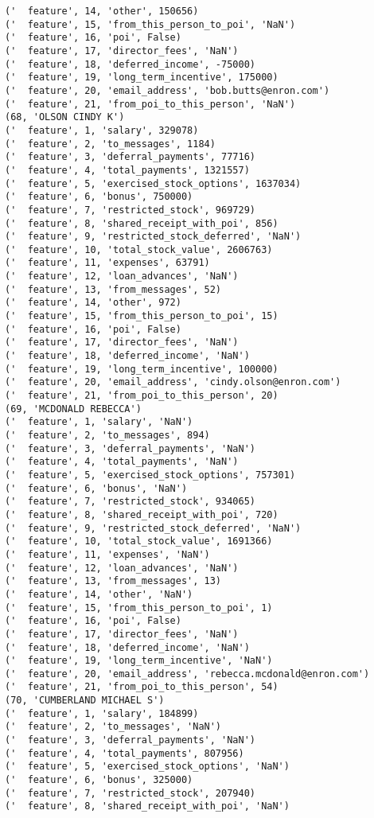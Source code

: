 \begin{verbatim}
('  feature', 14, 'other', 150656)
('  feature', 15, 'from_this_person_to_poi', 'NaN')
('  feature', 16, 'poi', False)
('  feature', 17, 'director_fees', 'NaN')
('  feature', 18, 'deferred_income', -75000)
('  feature', 19, 'long_term_incentive', 175000)
('  feature', 20, 'email_address', 'bob.butts@enron.com')
('  feature', 21, 'from_poi_to_this_person', 'NaN')
(68, 'OLSON CINDY K')
('  feature', 1, 'salary', 329078)
('  feature', 2, 'to_messages', 1184)
('  feature', 3, 'deferral_payments', 77716)
('  feature', 4, 'total_payments', 1321557)
('  feature', 5, 'exercised_stock_options', 1637034)
('  feature', 6, 'bonus', 750000)
('  feature', 7, 'restricted_stock', 969729)
('  feature', 8, 'shared_receipt_with_poi', 856)
('  feature', 9, 'restricted_stock_deferred', 'NaN')
('  feature', 10, 'total_stock_value', 2606763)
('  feature', 11, 'expenses', 63791)
('  feature', 12, 'loan_advances', 'NaN')
('  feature', 13, 'from_messages', 52)
('  feature', 14, 'other', 972)
('  feature', 15, 'from_this_person_to_poi', 15)
('  feature', 16, 'poi', False)
('  feature', 17, 'director_fees', 'NaN')
('  feature', 18, 'deferred_income', 'NaN')
('  feature', 19, 'long_term_incentive', 100000)
('  feature', 20, 'email_address', 'cindy.olson@enron.com')
('  feature', 21, 'from_poi_to_this_person', 20)
(69, 'MCDONALD REBECCA')
('  feature', 1, 'salary', 'NaN')
('  feature', 2, 'to_messages', 894)
('  feature', 3, 'deferral_payments', 'NaN')
('  feature', 4, 'total_payments', 'NaN')
('  feature', 5, 'exercised_stock_options', 757301)
('  feature', 6, 'bonus', 'NaN')
('  feature', 7, 'restricted_stock', 934065)
('  feature', 8, 'shared_receipt_with_poi', 720)
('  feature', 9, 'restricted_stock_deferred', 'NaN')
('  feature', 10, 'total_stock_value', 1691366)
('  feature', 11, 'expenses', 'NaN')
('  feature', 12, 'loan_advances', 'NaN')
('  feature', 13, 'from_messages', 13)
('  feature', 14, 'other', 'NaN')
('  feature', 15, 'from_this_person_to_poi', 1)
('  feature', 16, 'poi', False)
('  feature', 17, 'director_fees', 'NaN')
('  feature', 18, 'deferred_income', 'NaN')
('  feature', 19, 'long_term_incentive', 'NaN')
('  feature', 20, 'email_address', 'rebecca.mcdonald@enron.com')
('  feature', 21, 'from_poi_to_this_person', 54)
(70, 'CUMBERLAND MICHAEL S')
('  feature', 1, 'salary', 184899)
('  feature', 2, 'to_messages', 'NaN')
('  feature', 3, 'deferral_payments', 'NaN')
('  feature', 4, 'total_payments', 807956)
('  feature', 5, 'exercised_stock_options', 'NaN')
('  feature', 6, 'bonus', 325000)
('  feature', 7, 'restricted_stock', 207940)
('  feature', 8, 'shared_receipt_with_poi', 'NaN')

\end{verbatim}
